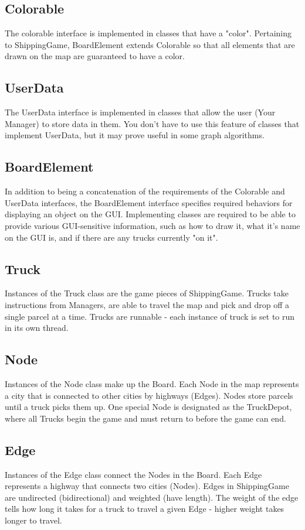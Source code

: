 \documentclass[11pt]{article}
\begin{document}
\subsection{Colorable}
The colorable interface is implemented in classes that have a "color".
Pertaining to ShippingGame, BoardElement extends Colorable so that all elements
that are drawn on the map are guaranteed to have a color.
\subsection{UserData}
The UserData interface is implemented in classes that allow the user (Your
Manager) to store data in them. You don't have to use this feature of classes
that implement UserData, but it may prove useful in some graph algorithms.
\subsection{BoardElement}
In addition to being a concatenation of the requirements of the Colorable and
UserData interfaces, the BoardElement interface specifies required behaviors for
displaying an object on the GUI. Implementing classes are required to be able to
provide various GUI-sensitive information, such as how to draw it, what it's
name on the GUI is, and if there are any trucks currently "on it".
\subsection{Truck}
Instances of the Truck class are the game pieces of ShippingGame. Trucks take
instructions from Managers, are able to travel the map and pick and drop off a
single parcel at a time. Trucks are runnable - each instance of truck is set to
run in its own thread.
\subsection{Node}
Instances of the Node class make up the Board. Each Node in the map represents a
city that is connected to other cities by highways (Edges). Nodes store parcels
until a truck picks them up. One special Node is designated as the TruckDepot,
where all Trucks begin the game and must return to before the game can end.
\subsection{Edge}
Instances of the Edge class connect the Nodes in the Board. Each Edge represents
a highway that connects two cities (Nodes). Edges in ShippingGame are undirected
(bidirectional) and weighted (have length). The weight of the edge tells how
long it takes for a truck to travel a given Edge - higher weight takes longer to
travel.
\end{document}
